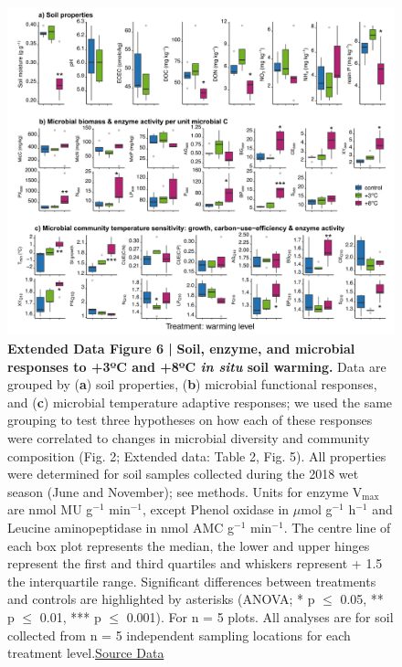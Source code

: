 \documentclass[
  letterpaper,
  DIV=11,
  numbers=noendperiod]{scrartcl}
\begin{document}
\begin{figure}

{\centering \includegraphics[width=1\textwidth,height=\textheight]{FIGURES/Extended_Data_Fig_6.png}

}

\caption{\textbf{Extended Data Figure 6 |}
\textbf{Soil, enzyme, and microbial responses to +3ºC and +8ºC \textsl{in situ} soil warming.}
Data are grouped by (\textbf{a}) soil properties, (\textbf{b}) microbial
functional responses, and (\textbf{c}) microbial temperature adaptive
responses; we used the same grouping to test three hypotheses on how
each of these responses were correlated to changes in microbial
diversity and community composition (Fig. 2; Extended data: Table 2,
Fig. 5). All properties were determined for soil samples collected
during the 2018 wet season (June and November); see methods. Units for
enzyme V\(_{\mathrm{max}}\) are nmol MU g\(^{-1}\) min\(^{-1}\), except
Phenol oxidase in \(\mu\)mol g\(^{-1}\) h\(^{-1}\) and Leucine
aminopeptidase in nmol AMC g\(^{-1}\) min\(^{-1}\). The centre line of
each box plot represents the median, the lower and upper hinges
represent the first and third quartiles and whiskers represent + 1.5 the
interquartile range. Significant differences between treatments and
controls are highlighted by asterisks (ANOVA; * p \(\le\) 0.05, ** p
\(\le\) 0.01, *** p \(\le\) 0.001). For n = 5 plots. All analyses are
for soil collected from n = 5 independent sampling locations for each
treatment
level.\href{https://doi.org/10.25573/data.20263857}{Source Data}}

\end{figure}
\end{document}
